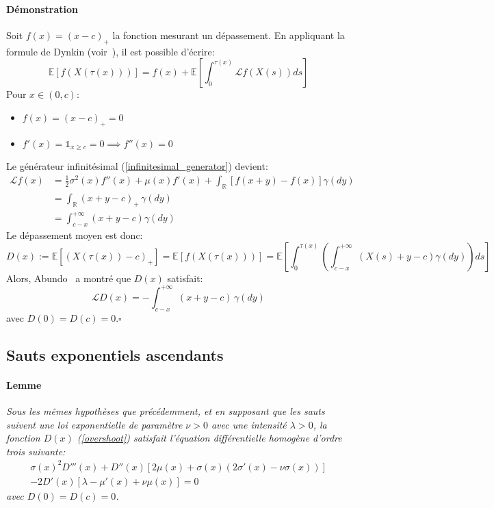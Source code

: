 \paragraph{Démonstration}
Soit $f(x)={(x-c)}_+$ la fonction mesurant un dépassement. En appliquant la formule de Dynkin (voir~\cite{dynkin1965}), il est possible d'écrire:
\begin{equation}\label{initial_dynkin}
    \mathds{E}[f(X(\tau(x)))]=f(x)+\mathds{E}\left[\int_0^{\tau(x)}\mathcal{L}f(X(s))ds\right]
\end{equation}
Pour $x\in(0,c)$:
\begin{itemize}
    \item $f(x)={(x-c)}_+=0$
    \item $f'(x)=\mathds{1}_{x\geq c}=0\implies f''(x)=0$
\end{itemize}
Le générateur infinitésimal (\ref{infinitesimal_generator}) devient:
\[
\begin{aligned}
    \mathcal{L}f(x) &= \frac{1}{2}\sigma^2(x)f''(x)+\mu(x)f'(x)+\int_{\mathds{R}}[f(x+y)-f(x)]\gamma(dy)\\
    &=\int_{\mathds{R}}(x+y-c)_+\,\gamma(dy) \\
    &=\int_{c-x}^{+\infty}(x+y-c)\gamma(dy)
\end{aligned}
\]
Le dépassement moyen est donc:
\[
D(x):=\mathds{E}\left[{(X(\tau(x))-c)}_+\right]=\mathds{E}[f(X(\tau(x)))]=\mathds{E}\left[\int_0^{\tau(x)}\left(\int_{c-x}^{+\infty}(X(s)+y-c)\gamma(dy)\right)ds\right]
\]
Alors, Abundo~\cite{abundo2013} a montré que $D(x)$ satisfait:
\[
\mathcal{L}D(x) = -\int_{c - x}^{+\infty} (x + y - c)\,\gamma(dy)
\]
avec $D(0)=D(c)=0$.\hfill$\square$

\subsection{Sauts exponentiels ascendants}
\paragraph{Lemme} 
\textit{Sous les mêmes hypothèses que précédemment, et en supposant que les sauts suivent une loi exponentielle de paramètre \(\nu > 0\) avec une intensité \(\lambda > 0\), la fonction \(D(x)\) (\ref{overshoot}) satisfait l'équation différentielle homogène d'ordre trois suivante:}
\begin{equation}\label{eq:general_ode_D}
    \begin{aligned}
        \sigma(x)^2 D'''(x)+D''(x) \left[2 \mu(x)+\sigma(x)(2\sigma'(x)-\nu  \sigma(x))\right]\\-2D'(x)[\lambda-\mu'(x)+\nu\mu(x)]=0
    \end{aligned}
\end{equation}
\textit{avec \(D(0) = D(c) = 0\).}

